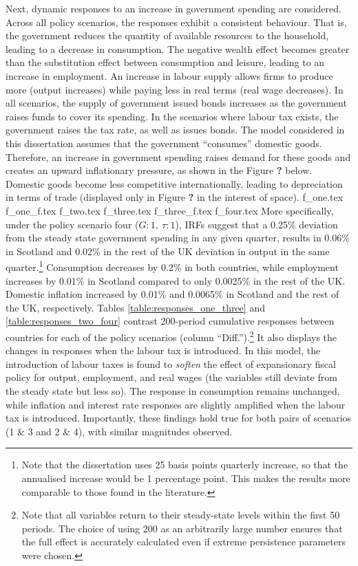 Next, dynamic responses to an increase in government spending are considered. Across all policy scenarios, the responses exhibit a consistent behaviour. That is, the government reduces the quantity of available resources to the household, leading to a decrease in consumption. The negative wealth effect becomes greater than the substitution effect between consumption and leisure, leading to an increase in employment. An increase in labour supply allows firms to produce more (output increases) while paying less in real terms (real wage decreases). In all scenarios, the supply of government issued bonds increases as the government raises funds to cover its spending. In the scenarios where labour tax exists, the government raises the tax rate, as well as issues bonds. The model considered in this dissertation assumes that the government ``consumes'' domestic goods. Therefore, an increase in government spending raises demand for these goods and creates an upward inflationary pressure, as shown in the Figure \textbf{?} below. Domestic goods become less competitive internationally, leading to depreciation in terms of trade (displayed only in Figure \textbf{?} in the interest of space). 
{f_one.tex}
{f_one_f.tex}
{f_two.tex}
{f_three.tex}
{f_three_f.tex}
{f_four.tex}
More specifically, under the policy scenario four ($G:1,\ \tau:1$), IRFs suggest that a 0.25\% deviation from the steady state government spending in any given quarter, results in 0.06\% in Scotland and 0.02\% in the rest of the UK deviation in output in the same quarter.\footnote{Note that the dissertation uses 25 basis points quarterly increase, so that the annualised increase would be 1 percentage point. This makes the results more comparable to those found in the literature.} Consumption decreases by 0.2\% in both countries, while employment increases by 0.01\% in Scotland compared to only 0.0025\% in the rest of the UK. Domestic inflation increased by 0.01\% and 0.0065\% in Scotland and the rest of the UK, respectively. Tables \ref{table:responses_one_three} and \ref{table:responses_two_four} contrast 200-period cumulative responses between countries for each of the policy scenarios (column ``Diff.'').\footnote{Note that all variables return to their steady-state levels within the first 50 periods. The choice of using 200 as an arbitrarily large number ensures that the full effect is accurately calculated even if extreme persistence parameters were chosen.} It also displays the changes in responses when the labour tax is introduced. In this model, the introduction of labour taxes is found to \textit{soften} the effect of expansionary fiscal policy for output, employment, and real wages (the variables still deviate from the steady state but less so).  The response in consumption remains unchanged, while inflation and interest rate responses are slightly amplified when the labour tax is introduced. Importantly, these findings hold true for both pairs of scenarios (1 \& 3 and 2 \& 4), with similar magnitudes observed.

